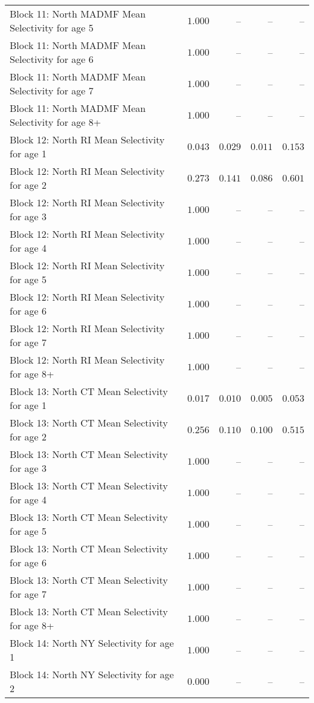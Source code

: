 \documentclass[
]{article}
\begin{document}
\begin{landscape}
\begin{longtable}[t]{lrrrr}
Block 11: North MADMF Mean Selectivity for age 5 & $1.000$ & -- & -- & --\\
Block 11: North MADMF Mean Selectivity for age 6 & $1.000$ & -- & -- & --\\
Block 11: North MADMF Mean Selectivity for age 7 & $1.000$ & -- & -- & --\\
\addlinespace
Block 11: North MADMF Mean Selectivity for age 8+ & $1.000$ & -- & -- & --\\
Block 12: North RI Mean Selectivity for age 1 & $0.043$ & $0.029$ & $0.011$ & $0.153$\\
Block 12: North RI Mean Selectivity for age 2 & $0.273$ & $0.141$ & $0.086$ & $0.601$\\
Block 12: North RI Mean Selectivity for age 3 & $1.000$ & -- & -- & --\\
Block 12: North RI Mean Selectivity for age 4 & $1.000$ & -- & -- & --\\
\addlinespace
Block 12: North RI Mean Selectivity for age 5 & $1.000$ & -- & -- & --\\
Block 12: North RI Mean Selectivity for age 6 & $1.000$ & -- & -- & --\\
Block 12: North RI Mean Selectivity for age 7 & $1.000$ & -- & -- & --\\
Block 12: North RI Mean Selectivity for age 8+ & $1.000$ & -- & -- & --\\
Block 13: North CT Mean Selectivity for age 1 & $0.017$ & $0.010$ & $0.005$ & $0.053$\\
\addlinespace
Block 13: North CT Mean Selectivity for age 2 & $0.256$ & $0.110$ & $0.100$ & $0.515$\\
Block 13: North CT Mean Selectivity for age 3 & $1.000$ & -- & -- & --\\
Block 13: North CT Mean Selectivity for age 4 & $1.000$ & -- & -- & --\\
Block 13: North CT Mean Selectivity for age 5 & $1.000$ & -- & -- & --\\
Block 13: North CT Mean Selectivity for age 6 & $1.000$ & -- & -- & --\\
\addlinespace
Block 13: North CT Mean Selectivity for age 7 & $1.000$ & -- & -- & --\\
Block 13: North CT Mean Selectivity for age 8+ & $1.000$ & -- & -- & --\\
Block 14: North NY Selectivity for age 1 & $1.000$ & -- & -- & --\\
Block 14: North NY Selectivity for age 2 & $0.000$ & -- & -- & --\\

\end{longtable}
\end{landscape}
\end{document}
